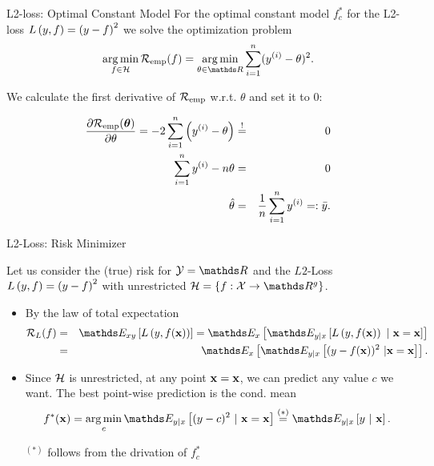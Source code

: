 \documentclass[11pt,compress,t,notes=noshow, xcolor=table]{beamer}
\begin{document}
\begin{vbframe}{L2-loss: Optimal Constant Model}
For the optimal constant model $f_{c}^{\ast}$ for the L2-loss $L\left(y, f\right) = \left(y - f\right)^2$ we solve the optimization problem 
$$
\argmin_{f \in \Hspace} \riskef = \argmin_{\theta \in \R} \sumin (\yi - \theta)^2. 
$$


We calculate the first derivative of $\mathcal{R}_{\text{emp}}$ w.r.t. $\theta$ and set it to $0$: 


\begin{eqnarray*}
\frac{\partial \mathcal{R}_{\text{emp}}(\bm{\theta})}{\partial \theta} = -2 \sum\limits_{i=1}^n \left(y^{(i)} - \theta\right) &\overset{!}{=}& 0 \\
\sum\limits_{i=1}^n y^{(i)} - n \theta&=& 0 \\
\hat \theta&=& \frac{1}{n} \sum\limits_{i=1}^n y^{(i)} =: \bar y.
\end{eqnarray*}


\end{vbframe}

\begin{vbframe}{L2-Loss: Risk Minimizer}

Let us consider the (true) risk for  $\Yspace = \R$ and the $L2$-Loss $L\left(y, f\right) = \left(y-f\right)^2$ with unrestricted $\Hspace = \{f: \Xspace \to \R^g\}$. 

\begin{itemize}
\item By the law of total expectation
  \begin{eqnarray*}
    \risk_L(f) &=& \E_{xy} \left[\Lxy\right] 
    = \E_x \left[\E_{y|x}\left[\Lxy~|~\xv = \xv\right]\right] \\
  &=& \E_x
  \left[\E_{y|x}\left[(y-\fx)^2~|\xv = \xv\right]\right]. 
  \end{eqnarray*}

\item Since $\mathcal{H}$ is unrestricted, at any point $\mathbf{x} = \mathbf{x}$, we can predict any value $c$ we want. The best point-wise prediction is the cond. mean
$$
  \fxbayes = \argmin_c \E_{y|x}\left[(y - c)^2 ~|~ \xv = \xv \right]\overset{(*)}{=} \E_{y|x} \left[y ~|~ \xv \right]. 
$$

\begin{footnotesize}
$^{(*)}$ follows from the drivation of $f_{c}^{\ast}$
\end{footnotesize}

\end{itemize}


\end{vbframe}
\end{document}
